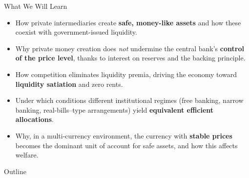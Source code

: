 \documentclass[11pt,aspectratio=169]{beamer}
\begin{document}
% 
\begin{frame}{What We Will Learn}
\small
\begin{itemize}

  \item How private intermediaries create \textbf{safe, money-like assets} and how these coexist with government-issued liquidity.

  \vspace{0.6em}

  \item Why private money creation does \emph{not} undermine the central bank’s \textbf{control of the price level}, thanks to interest on reserves and the backing principle.

  \vspace{0.6em}

  \item How competition eliminates liquidity premia, driving the economy toward \textbf{liquidity satiation} and zero rents.

  \vspace{0.6em}

  \item Under which conditions different institutional regimes  
  (free banking, narrow banking, real-bills–type arrangements)  
  yield \textbf{equivalent efficient allocations}.

  \vspace{0.6em}

  \item Why, in a multi-currency environment, the currency with \textbf{stable prices} becomes the dominant unit of account for safe assets, and how this affects welfare.
  
\end{itemize}
\end{frame}
\begin{frame}{Outline}
\tableofcontents
\end{frame}
\end{document}
